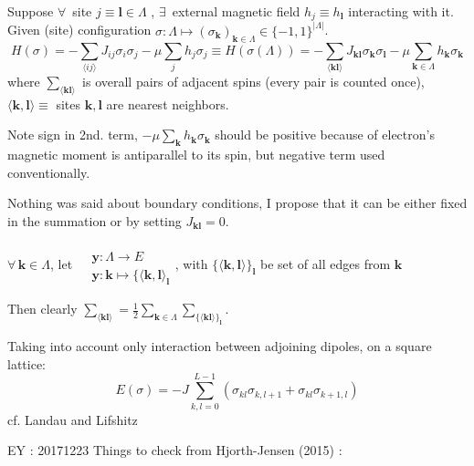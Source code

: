 \documentclass[10pt]{amsart}
\begin{document}
\begin{multicols*}{2}
Suppose $\forall \, $ site $j \equiv \mathbf{l} \in \Lambda$ , $\exists \, $ external magnetic field $h_j \equiv h_{\mathbf{l}}$ interacting with it.  \\
Given (site) configuration $\sigma : \Lambda \mapsto (\sigma_{\mathbf{k}})_{\mathbf{k} \in \Lambda} \in \lbrace -1 ,1 \rbrace^{ | \Lambda | }$.  
\begin{equation}
H(\sigma) = -\sum_{ \langle i j \rangle } J_{ij} \sigma_i \sigma_j - \mu \sum_j h_j \sigma_j \equiv H(\sigma(\Lambda)) = -\sum_{\langle \mathbf{k} \mathbf{l} \rangle } J_{\mathbf{k} \mathbf{l} }\sigma_{\mathbf{k}} \sigma_{\mathbf{l}} - \mu \sum_{ \mathbf{k} \in \Lambda } h_{\mathbf{k}} \sigma_{ \mathbf{k}}
\end{equation}
where $\sum_{ \langle \mathbf{k} \mathbf{l} \rangle }$ is overall pairs of adjacent spins (every pair is counted once),  \\
\phantom{where } $\langle \mathbf{k}, \mathbf{l} \rangle \equiv $ sites $\mathbf{k}, \mathbf{l}$ are nearest neighbors.  

Note sign in 2nd. term, $-\mu \sum_{\mathbf{k}} h_{\mathbf{k}} \sigma_{\mathbf{k}}$ should be positive because of electron's magnetic moment is antiparallel to its spin, but negative term used conventionally.  

Nothing was said about boundary conditions, I propose that it can be either fixed in the summation or by setting $J_{\mathbf{k} \mathbf{l}}=0$.  

$\forall \, \mathbf{k} \in \Lambda$, let $\begin{aligned} & \quad \\
	& \mathbf{y} : \Lambda \to E \\ 
		& \mathbf{y}: \mathbf{k} \mapsto \lbrace \langle \mathbf{k}, \mathbf{l} \rangle_{\mathbf{l}} \end{aligned}$, with $\lbrace \langle \mathbf{k}, \mathbf{l} \rangle \rbrace_{\mathbf{l}}$ be set of all edges from $\mathbf{k}$
		
		Then clearly $\sum_{\langle \mathbf{k} \mathbf{l} \rangle } = \frac{1}{2} \sum_{\mathbf{k} \in \Lambda} \sum_{ \lbrace \langle \mathbf{k} \mathbf{l} \rangle \rbrace_{\mathbf{l}}}$.  
		
		
Taking into account only interaction between adjoining dipoles, on a square lattice: 
\[
E(\sigma) = -J \sum_{k,l=0}^{L-1} ( \sigma_{kl}\sigma_{k,l+1} + \sigma_{kl} \sigma_{k+1, l} )
\]
cf. Landau and Lifshitz \cite{LaLi1980}


EY : 20171223 Things to check from Hjorth-Jensen (2015) \cite{Hjor2015}:  


\end{multicols*}
\end{document}

